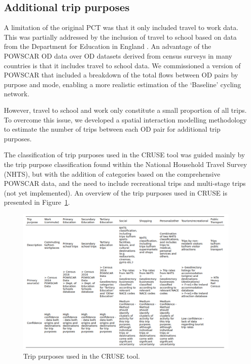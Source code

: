 \documentclass[
  super,
  preprint,
  3p]{elsarticle}
\begin{document}
\hypertarget{sec-trip-purposes}{%
\subsection{Additional trip purposes}\label{sec-trip-purposes}}

A limitation of the original PCT was that it only included travel to
work data. This was partially addressed by the inclusion of travel to
school based on data from the Department for Education in England
\citep{goodman2019}. An advantage of the POWSCAR OD data over OD
datasets derived from census surveys in many countries is that it
includes travel to school data. We commissioned a version of POWSCAR
that included a breakdown of the total flows between OD pairs by purpose
and mode, enabling a more realistic estimation of the `Baseline' cycling
network.

However, travel to school and work only constitute a small proportion of
all trips. To overcome this issue, we developed a spatial interaction
modelling methodology to estimate the number of trips between each OD
pair for additional trip purposes.

The classification of trip purposes used in the CRUSE tool was guided
mainly by the trip purpose classification found within the National
Household Travel Survey (NHTS), but with the addition of categories
based on the comprehensive POWSCAR data, and the need to include
recreational trips and multi-stage trips (not yet implemented). An
overview of the trip purposes used in CRUSE is presented in
Figure~\ref{fig-trip-purposes}.

\begin{figure}

{\centering 

\includegraphics{images/paste-4.png}

}

\caption{\label{fig-trip-purposes}Trip purposes used in the CRUSE tool.}

\end{figure}
\end{document}
